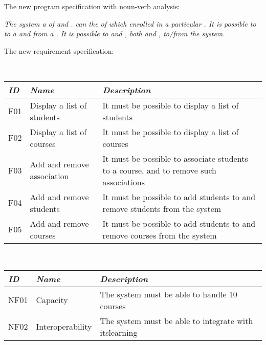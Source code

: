 The new program specification with noun-verb analysis:

\begin{center}
  \textsl{The  system  a  of  and .  can  the  of  which  enrolled in a particular . It is possible to   to a  and   from a . It is possible to  and , both  and , to/from the  system.}
\end{center}

The new requirement specification:

\begin{itemize}
   \\
    \begin{tabular}{|p{8mm}|p{4cm}|p{6cm}|}
      \hline
      \emph{ID} & \emph{Name} & \emph{Description} \\
      \hline
      F01 & Display a list of students & It must be possible to display a list of students \\
      \hline
      F02 & Display a list of courses & It must be possible to display a list of courses \\
      \hline
      F03 & Add and remove association & It must be possible to associate students to a course, and to remove such associations \\
      \hline
      F04 & Add and remove students & It must be possible to add students to and remove students from the system \\
      \hline
      F05 & Add and remove courses & It must be possible to add students to and remove courses from the system \\
      \hline
    \end{tabular}
   \\
    \begin{tabular}{|p{8mm}|p{4cm}|p{6cm}|}
      \hline
      \emph{ID} & \emph{Name} & \emph{Description} \\
      \hline
      NF01 & Capacity & The system must be able to handle 10 courses \\
      \hline
      NF02 & Interoperability & The system must be able to integrate with itslearning \\
      \hline
    \end{tabular}
\end{itemize}

